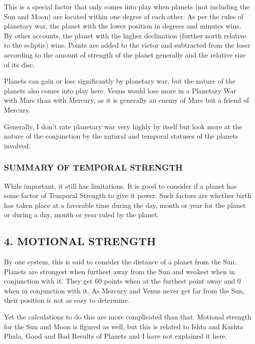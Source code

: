  

This is a special factor that only comes into play when planets (not including the Sun and Moon) are located within one degree of each other. As per the rules of planetary war, the planet with the lower position in degrees and minutes wins. By other accounts, the planet with the higher declination (further north relative to the ecliptic) wins. Points are added to the victor and subtracted from the loser according to the amount of strength of the planet generally and the relative size of its disc.

 

Planets can gain or lose significantly by planetary war, but the nature of the planets also comes into play here. Venus would lose more in a Planetary War with Mars than with Mercury, as it is generally an enemy of Mars but a friend of Mercury.

 

Generally, I don’t rate planetary war very highly by itself but look more at the nature of the conjunction by the natural and temporal statuses of the planets involved.

 

\subsubsection{SUMMARY OF TEMPORAL STRENGTH}

 

While important, it still has limitations. It is good to consider if a planet has some factor of Temporal Strength to give it power. Such factors are whether birth has taken place at a favorable time during the day, month or year for the planet or during a day, month or year ruled by the planet.

 

\subsection{4. MOTIONAL STRENGTH}
 

By one system, this is said to consider the distance of a planet from the Sun. Planets are strongest when furthest away from the Sun and weakest when in conjunction with it. They get 60 points when at the furthest point away and 0 when in conjunction with it. As Mercury and Venus never get far from the Sun, their position is not as easy to determine.

 

Yet the calculations to do this are more complicated than that. Motional strength for the Sun and Moon is figured as well, but this is related to Ishta and Kashta Phala, Good and Bad Results of Planets and I have not explained it here.

